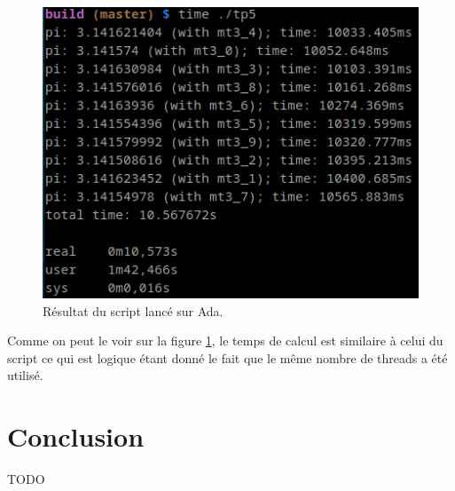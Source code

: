 \documentclass[a4paper]{article}
\begin{document}
\begin{figure}[ht!]
  \centering
  \includegraphics[scale=0.5]{./img/pi_threads.png}
  \caption{Résultat du script lancé sur Ada.}
  \label{fig:threads}
\end{figure}
\clearpage

Comme on peut le voir sur la figure \ref{fig:threads}, le temps de calcul est
similaire à celui du script ce qui est logique étant donné le fait que le même
nombre de threads a été utilisé.

\clearpage
\section{Conclusion}

TODO
\end{document}
